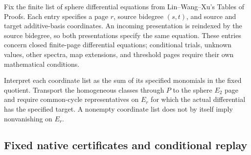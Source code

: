 \begin{definition}
  \label{def:lin-proofs-sphere-table}
  Fix the finite list of sphere differential equations from
  Lin--Wang--Xu's Tables of Proofs. Each entry specifies a page $r$,
  source bidegree $(s,t)$, and source and target additive-basis
  coordinates. An incoming presentation is reindexed by the source
  bidegree, so both presentations specify the same equation.
  These entries concern closed finite-page differential equations;
  conditional trials, unknown values, other spectra, map extensions,
  and threshold pages require their own mathematical conditions.
\end{definition}

\begin{definition}
  \label{def:lin-proofs-sphere-meaning}
  Interpret each coordinate list as the sum of its specified monomials
  in the fixed quotient. Transport the homogeneous classes through $P$
  to the sphere $E_2$ page and require common-cycle representatives on
  $E_r$ for which the actual differential has the specified target.
  A nonempty coordinate list does not by itself imply nonvanishing
  on $E_r$.
\end{definition}

\subsection{Fixed native certificates and conditional replay}

